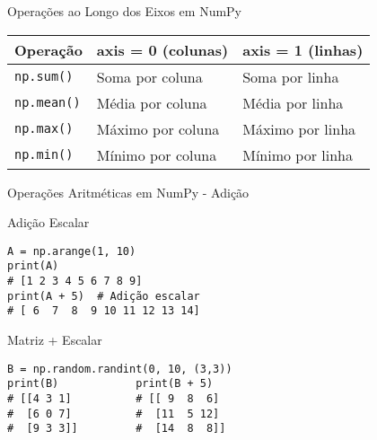 \begin{frame}{Operações ao Longo dos Eixos em NumPy}

\centering
\begin{tabular}{|l|p{5cm}|p{5cm}|}
\hline
\textbf{Operação} & \textbf{axis = 0 (colunas)} & \textbf{axis = 1 (linhas)} \\
\hline
\texttt{np.sum()} & Soma por coluna & Soma por linha \\
\hline
\texttt{np.mean()} & Média por coluna & Média por linha \\
\hline
\texttt{np.max()} & Máximo por coluna & Máximo por linha \\
\hline
\texttt{np.min()} & Mínimo por coluna & Mínimo por linha \\
\hline
\end{tabular}


\end{frame}

\begin{frame}[fragile]{Operações Aritméticas em NumPy - Adição}

\begin{block}{Adição Escalar}
\begin{verbatim}
A = np.arange(1, 10)
print(A)
# [1 2 3 4 5 6 7 8 9]
print(A + 5)  # Adição escalar
# [ 6  7  8  9 10 11 12 13 14]
\end{verbatim}
\end{block}


        \begin{exampleblock}{Matriz + Escalar}
\begin{verbatim}
B = np.random.randint(0, 10, (3,3))
print(B)            print(B + 5)  
# [[4 3 1]          # [[ 9  8  6]
#  [6 0 7]          #  [11  5 12]
#  [9 3 3]]         #  [14  8  8]]
\end{verbatim}
        \end{exampleblock}
   


\end{frame}

